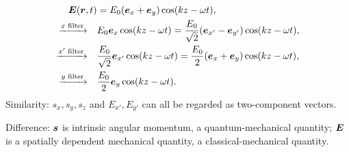 \begin{equation}\begin{aligned}
\bm{E}(\bm{r},t)&=E_0(\bm{e}_x+\bm{e}_y)\cos(kz-\omega t),\\
\xrightarrow{x\text{ filter}}\quad&E_0\bm{e}_x\cos(kz-\omega t)=\frac{E_0}{\sqrt2}(\bm{e}_{x'}-\bm{e}_{y'})\cos(kz-\omega t),\\
\xrightarrow{x'\text{ filter}}\quad&\frac{E_0}{\sqrt2}\bm{e}_{x'}\cos(kz-\omega t)=\frac{E_0}{2}(\bm{e}_x+\bm{e}_y)\cos(kz-\omega t),\\
\xrightarrow{y\text{ filter}}\quad&\frac{E_0}{2}\bm{e}_y\cos(kz-\omega t).
\end{aligned}\end{equation}
Similarity: $s_x,s_y,s_z$ and $E_{x'},E_{y'}$ can all be regarded as two-component vectors.

Difference: $\bm{s}$ is intrinsic angular momentum, a quantum-mechanical quantity; $\bm{E}$ is a spatially dependent mechanical quantity, a classical-mechanical quantity.